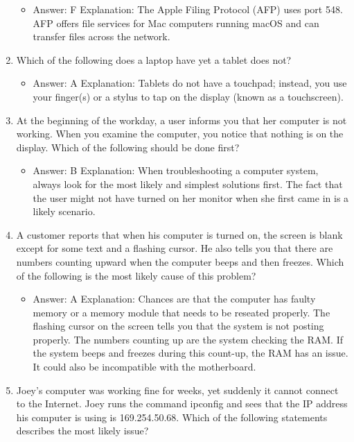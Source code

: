 \documentclass{article}
\begin{document}
\begin{enumerate}
    \begin{itemize}
        \item Answer: F
Explanation: The Apple Filing Protocol (AFP) uses port 548. AFP offers file services for
Mac computers running macOS and can transfer files across the network.
    \end{itemize}
    \item Which of the following does a laptop have yet a tablet does not?
    \begin{itemize}
        \item Answer: A
Explanation: Tablets do not have a touchpad; instead, you use your finger(s) or a stylus
to tap on the display (known as a touchscreen).
    \end{itemize}
    \item At the beginning of the workday, a user informs you that her computer
is not working. When you examine the computer, you notice
that nothing is on the display. Which of the following should be
done first?
    \begin{itemize}
        \item Answer: B
Explanation: When troubleshooting a computer system, always look for the most likely
and simplest solutions first. The fact that the user might not have turned on her monitor
when she first came in is a likely scenario.
    \end{itemize}
    \item A customer reports that when his computer is turned on, the
screen is blank except for some text and a flashing cursor. He also
tells you that there are numbers counting upward when the computer
beeps and then freezes. Which of the following is the most
likely cause of this problem?
    \begin{itemize}
        \item Answer: A
Explanation: Chances are that the computer has faulty memory or a memory module
that needs to be reseated properly. The flashing cursor on the screen tells you that the
system is not posting properly. The numbers counting up are the system checking the
RAM. If the system beeps and freezes during this count-up, the RAM has an issue. It
could also be incompatible with the motherboard.
    \end{itemize}
    \item Joey’s computer was working fine for weeks, yet suddenly it cannot
connect to the Internet. Joey runs the command ipconfig and
sees that the IP address his computer is using is 169.254.50.68.
Which of the following statements describes the most likely issue?

\end{enumerate}
\end{document}
